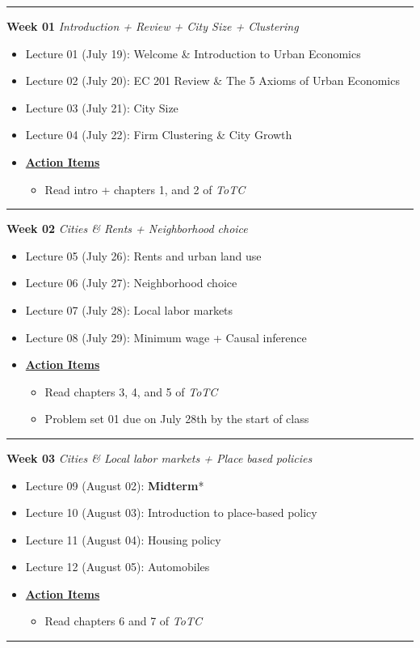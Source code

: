 \documentclass[11pt]{article}
\begin{document}
	\noindent\rule[0.5ex]{\linewidth}{1pt}
	\textbf{Week 01} \textit{Introduction + Review + City Size + Clustering}
	\begin{itemize}
		\item Lecture 01 (July 19): Welcome \& Introduction to Urban Economics
		\item Lecture 02 (July 20): EC 201 Review \& The 5 Axioms of Urban Economics
		\item Lecture 03 (July 21): City Size
		\item Lecture 04 (July 22):  Firm Clustering \& City Growth
		\item[]\underline{\textbf{Action Items}}
		\begin{itemize}
			\item Read intro + chapters 1, and 2 of \textit{ToTC}
		\end{itemize}
	\end{itemize}
	\noindent\rule[0.5ex]{\linewidth}{1pt}
	
	\textbf{Week 02} \textit{Cities \& Rents + Neighborhood choice}
	\begin{itemize}
		\item Lecture 05 (July 26): Rents and urban land use
		\item Lecture 06 (July 27): Neighborhood choice 
		\item Lecture 07 (July 28): Local labor markets
		\item Lecture 08 (July 29): Minimum wage + Causal inference
		\item[]\underline{\textbf{Action Items}}
		\begin{itemize}
				\item Read chapters 3, 4, and 5 of \textit{ToTC}
				\item Problem set 01 due on July 28th by the start of class
		\end{itemize}
	\end{itemize}
	\noindent\rule[0.5ex]{\linewidth}{1pt}
	
		\textbf{Week 03} \textit{Cities \& Local labor markets + Place based policies}
	\begin{itemize}
		\item Lecture 09 (August 02): \textbf{Midterm}*
		\item Lecture 10 (August 03): Introduction to place-based policy
		\item Lecture 11 (August 04): Housing policy
		\item Lecture 12 (August 05): Automobiles
		\item[]\underline{\textbf{Action Items}}
		\begin{itemize}
				\item Read chapters 6 and 7 of \textit{ToTC}
		\end{itemize}
	\end{itemize}
	\noindent\rule[0.5ex]{\linewidth}{1pt}
	
\end{document}

